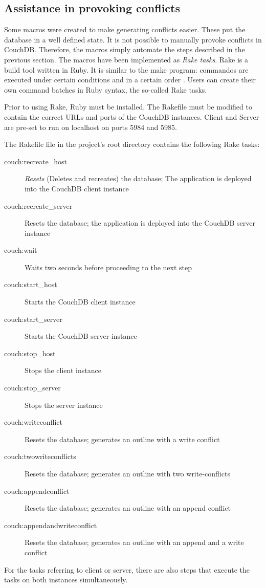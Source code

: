 \afterpage{\clearpage}

\subsection{Assistance in provoking conflicts}
\label{subsec:hilfestellung}

Some macros were created to make generating conflicts easier. These put the database in a well defined state. It is not possible to manually provoke conflicts in CouchDB. Therefore, the macros simply automate the steps described in the previous section. The macros have been implemented as \textit{Rake tasks}. Rake is a build tool written in Ruby. It is similar to the make program: commandos are executed under certain conditions and in a certain order \cite{rake:website}. Users can create their own command batches in Ruby syntax, the so-called Rake tasks.

Prior to using Rake, Ruby \cite{ruby:homepage} must be installed. The Rakefile must be modified to contain the correct URLs and ports of the CouchDB instances. Client and Server are pre-set to run on localhost on ports 5984 and 5985.

The {\selectfont Rakefile} file in the project's root directory contains the following Rake tasks:

\begin{description}
  \item[couch:recreate\_host] \textit{Resets} (Deletes and recreates) the database; The application is deployed into the CouchDB client instance
  \item[couch:recreate\_server] Resets the database; the application is deployed into the CouchDB server instance
  \item[couch:wait] Waits two seconds before proceeding to the next step
  \item[couch:start\_host] Starts the CouchDB client instance
  \item[couch:start\_server] Starts the CouchDB server instance
  \item[couch:stop\_host] Stops the client instance
  \item[couch:stop\_server] Stops the server instance
  \item[couch:writeconflict] Resets the database; generates an outline with a write conflict
  \item[couch:twowriteconflicts] Resets the database; generates an outline with two write-conflicts
  \item[couch:appendconflict] Resets the database; generates an outline with an append conflict
  \item[couch:appendandwriteconflict] Resets the database; generates an outline with an append and a write conflict
\end{description}

For the tasks referring to client or server, there are also steps that execute the tasks on both instances simultaneously.